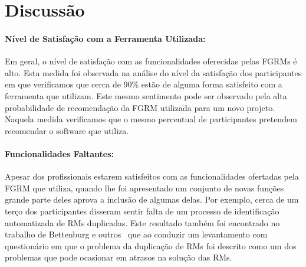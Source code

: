 \begin{table}[htpb]
\centering
{}
\caption{Classificação das funcionalidades que possam dar suporte ao uso das
metodologias dos agilistas.}
\label{tab:melhorias_fgrm_suporte_particas_ageis}
\end{table}

\section{Discussão}

\paragraph{Nível de Satisfação com a Ferramenta Utilizada:}
\label{par:pesq_profissionais_nivel_de_satisfação}

Em geral, o nível de satisfação com as funcionalidades oferecidas pelas FGRMs é
alto. Esta medida foi observada na análise do nível da satisfação dos
participantes em que verificamos que cerca de 90\% estão de alguma forma
satisfeito com a ferramenta que utilizam. Este mesmo sentimento pode ser
observado pela alta probabilidade de recomendação da FGRM utilizada para um novo
projeto. Naquela medida verificamos que o mesmo percentual de participantes
pretendem recomendar o software que utiliza.

\paragraph{Funcionalidades Faltantes:}
\label{par:pesq_profissionais_funcionalidades_faltantes}

Apesar dos profissionais estarem satisfeitos com as funcionalidades ofertadas
pela FGRM que utiliza, quando lhe foi apresentado um conjunto de novas funções
grande parte deles aprova a inclusão de algumas delas. Por exemplo, cerca de um
terço dos participantes disseram sentir falta de um processo de identificação
automatizada de RMs duplicadas. Este resultado também foi encontrado no trabalho
de Bettenburg e outros~\cite{bettenburg2008makes} que ao conduzir um
levantamento com questionário em que o problema da duplicação de RMs foi descrito
como um dos problemas que pode ocasionar em atrasos na solução das RMs.

